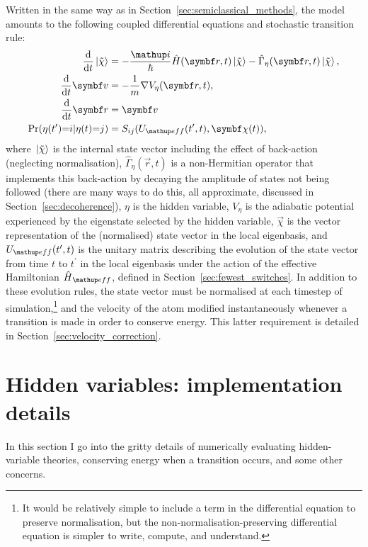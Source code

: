 Written in the same way as in Section~\ref{sec:semiclassical_methods}, the model amounts to the following coupled differential equations and stochastic transition rule:
\begin{align}\label{eq:eq:hvsc_semiclassical_simple_first}
\dv{t}\ket{\tilde\chi} &= -\frac\ii\hbar \hat H(\vec r, t)\ket{\tilde\chi} - \hat\Gamma_\eta(\vec r, t)\ket{\tilde\chi},\\
\dv{t}\vec v &= -\frac1m\nabla V_\eta(\vec r, t),\\
\dv{t}\vec r &= \vec v\\
\Pr(\eta(t^\prime){=}i|\eta(t){=}j) &= S_{ij}(U_\up{eff}(t^\prime, t), \vec\chi(t)),
\label{eq:hvsc_semiclassical_simple_last}
\end{align}
where $\ket{\tilde\chi}$ is the internal state vector including the effect of back-action (neglecting normalisation), $\hat\Gamma_\eta(\vec r, t)$ is a non-Hermitian operator that implements this back-action by decaying the amplitude of states not being followed (there are many ways to do this, all approximate, discussed in Section~\ref{sec:decoherence}), $\eta$ is the hidden variable, $V_\eta$ is the adiabatic potential experienced by the eigenstate selected by the hidden variable, $\vec\chi$ is the vector representation of the (normalised) state vector in the local eigenbasis, and $U_\up{eff}(t^\prime, t)$ is the unitary matrix describing the evolution of the state vector from time $t$ to $t^\prime$ in the local eigenbasis under the action of the effective Hamiltonian $\hat H_\up{eff}$, defined in Section~\ref{sec:fewest_switches}. In addition to these evolution rules, the state vector must be normalised at each timestep of simulation,\footnote{It would be relatively simple to include a term in the differential equation to preserve normalisation, but the non-normalisation-preserving differential equation is simpler to write, compute, and understand.} and the velocity of the atom modified instantaneously whenever a transition is made in order to conserve energy. This latter requirement is detailed in Section~\ref{sec:velocity_correction}.

\section{Hidden variables: implementation details}\label{sec:implementation_details}

In this section I go into the gritty details of numerically evaluating hidden-variable theories, conserving energy when a transition occurs, and some other concerns.

